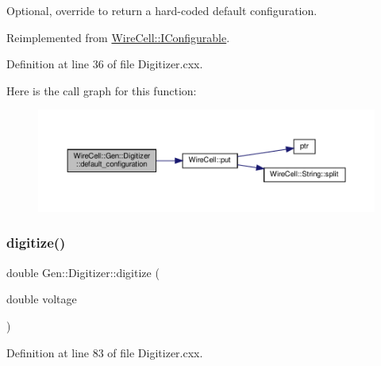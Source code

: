 Optional, override to return a hard-\/coded default configuration. 



Reimplemented from \hyperlink{class_wire_cell_1_1_i_configurable_a54841b2da3d1ea02189478bff96f7998}{Wire\+Cell\+::\+I\+Configurable}.



Definition at line 36 of file Digitizer.\+cxx.

Here is the call graph for this function\+:
\nopagebreak
\begin{figure}[H]
\begin{center}
\leavevmode
\includegraphics[width=350pt]{class_wire_cell_1_1_gen_1_1_digitizer_a6f8c0cf139021b7b54162e1dc42d9668_cgraph}
\end{center}
\end{figure}
\mbox{\label{class_wire_cell_1_1_gen_1_1_digitizer_a0280442eb3c74a29e73899d976aa83f6}} 
\subsubsection{\texorpdfstring{digitize()}{digitize()}}
{\footnotesize\ttfamily double Gen\+::\+Digitizer\+::digitize (\begin{DoxyParamCaption}\item[{double}]{voltage }\end{DoxyParamCaption})}



Definition at line 83 of file Digitizer.\+cxx.


